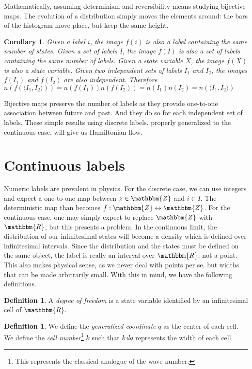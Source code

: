 \documentclass[aps,pra,10pt,twocolumn,floatfix,nofootinbib]{revtex4-1}
\newtheorem{cor}[thm]{Corollary}
\theoremstyle{definition}
\newtheorem{defn}[thm]{Definition}
\begin{document}
Mathematically, assuming determinism and reversibility means studying bijective maps. The evolution of a distribution simply moves the elements around: the bars of the histogram move place, but keep the same height.

\begin{cor}\label{labelsCount}
Given a label $i$, the image $f(i)$ is also a label containing the same number of states. Given a set of labels $I$, the image $f(I)$ is also a set of labels containing the same number of labels. Given a state variable $X$, the image $f(X)$ is also a state variable. Given two independent sets of labels $I_1$ and $I_2$, the images $f(I_1)$ and $f(I_2)$ are also independent. Therefore $n(f(\langle I_1, I_2 \rangle))=n(f(I_1))n(f(I_2))=n(I_1)n(I_2)=n(\langle I_1, I_2 \rangle)$
\end{cor}

Bijective maps preserve the number of labels as they provide one-to-one association between future and past. And they do so for each independent set of labels. These simple results using discrete labels, properly generalized to the continuous case, will give us Hamiltonian flow.

\section{Continuous labels}

Numeric labels are prevalent in physics. For the discrete case, we can use integers and expect a one-to-one map between $z\in\mathbbm{Z}$ and $i\in I$. The deterministic map than becomes $f:\mathbbm{Z} \leftrightarrow \mathbbm{Z}$. For the continuous case, one may simply expect to replace $\mathbbm{Z}$ with $\mathbbm{R}$, but this presents a problem. In the continuous limit, the distribution of our infinitesimal states will become a density which is defined over infinitesimal intervals. Since the distribution and the states must be defined on the same object, the label is really an interval over $\mathbbm{R}$, not a point. This also makes physical sense, as we never deal with points per se, but widths that can be made arbitrarily small. With this in mind, we have the following definitions.

\begin{defn}\label{sdof}
A \emph{degree of freedom} is a state variable identified by an infinitesimal cell of $\mathbbm{R}$.
\end{defn}

\begin{defn}\label{sdof}
We define the \emph{generalized coordinate} $q$ as the center of each cell. We define the \emph{cell number}\footnote{This represents the classical analogue of the wave number.} $k$ such that $k \, dq$ represents the width of each cell.
\end{defn}
\end{document}
